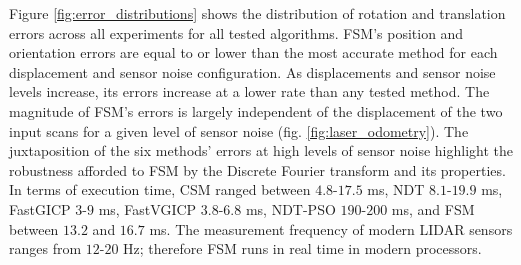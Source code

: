 \begin{figure*}
\begin{framed}
  \vspace{-0.75cm}\hspace{-0.75cm}
    \subfloat{}
    \qquad \hspace{-1.25cm}
    \subfloat{}
    \vspace{-2.5cm}
    \caption{\small Distribution of orientation and position errors across a
             range of maximal positional and orientational displacements, for
             progressively larger sensor measurement noise levels. Each boxplot
             represents $10$ iterations over $\sum|D_k| \approx
             45$$\cdot$$10^3$ random scan pairs for each configuration,
             $k=1,\dots,5$. Dots signify mean errors. FSM's errors are largely
             independent of the initial displacement of scans for a given level
             of sensor noise}%
    \label{fig:error_distributions}%
\end{framed}
\end{figure*}

Figure \ref{fig:error_distributions} shows the distribution of rotation and
translation errors across all experiments for all tested algorithms.  FSM's
position and orientation errors are equal to or lower than the most accurate
method for each displacement and sensor noise configuration. As displacements
and sensor noise levels increase, its errors increase at a lower rate than any
tested method. The magnitude of FSM's errors is largely independent of the
displacement of the two input scans for a given level of sensor noise (fig.
\ref{fig:laser_odometry}). The juxtaposition of the six methods' errors at high
levels of sensor noise highlight the robustness afforded to FSM by the Discrete
Fourier transform and its properties.  In terms of execution time, CSM ranged
between $4.8$-$17.5$ ms, NDT $8.1$-$19.9$ ms, FastGICP $3$-$9$ ms, FastVGICP
$3.8$-$6.8$ ms, NDT-PSO $190$-$200$ ms, and FSM between $13.2$ and $16.7$ ms.
The measurement frequency of modern LIDAR sensors ranges from $12$-$20$ Hz;
therefore FSM runs in real time in modern processors.
